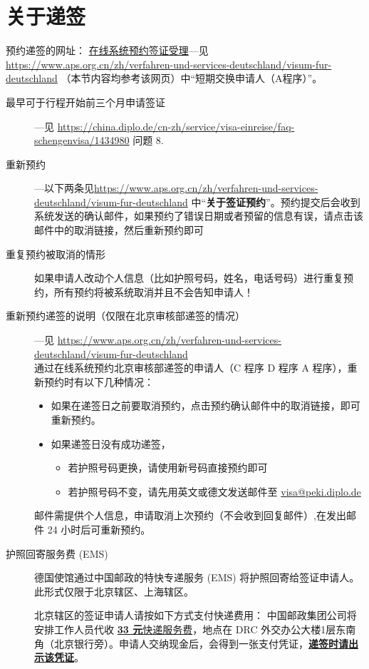 \documentclass[final]{book}
\begin{document}
\section{关于递签}\label{sec:visa}
\sloppy 预约递签的网址： \href{https://service2.diplo.de/rktermin/extern/choose_category.do?locationCode=peki&realmId=12&categoryId=156&request_locale=de}{在线系统预约签证受理}---见 \url{https://www.aps.org.cn/zh/verfahren-und-services-deutschland/visum-fur-deutschland} （本节内容均参考该网页）中“短期交换申请人（A程序）”。
\begin{description}
\item[最早可于行程开始前三个月申请签证] ---见 \url{https://china.diplo.de/cn-zh/service/visa-einreise/faq-schengenvisa/1434980} 问题 8.
\item[重新预约] ---以下两条见\sloppy \url{https://www.aps.org.cn/zh/verfahren-und-services-deutschland/visum-fur-deutschland} 中“\textbf{关于签证预约}”。预约提交后会收到系统发送的确认邮件，如果预约了错误日期或者预留的信息有误，请点击该邮件中的取消链接，然后重新预约即可
\item[重复预约被取消的情形] 如果申请人改动个人信息（比如护照号码，姓名，电话号码）进行重复预约，所有预约将被系统取消并且不会告知申请人！ 
\item[重新预约递签的说明（仅限在北京审核部递签的情况）] ---见 \url{https://www.aps.org.cn/zh/verfahren-und-services-deutschland/visum-fur-deutschland}\\
通过在线系统预约北京审核部递签的申请人（C 程序 D 程序 A 程序），重新预约时有以下几种情况：
\begin{itemize}
\item 如果在递签日之前要取消预约，点击预约确认邮件中的取消链接，即可重新预约。
\item 如果递签日没有成功递签，
\begin{itemize}
  \item 若护照号码更换，请使用新号码直接预约即可
  \item 若护照号码不变，请先用英文或德文发送邮件至 \href{mailto:visa@peki.diplo.de}{visa@peki.diplo.de}
\end{itemize}
\end{itemize}
邮件需提供个人信息，申请取消上次预约（不会收到回复邮件）,在发出邮件 24 小时后可重新预约。
\item[护照回寄服务费 (EMS)]

德国使馆通过中国邮政的特快专递服务 (EMS) 将护照回寄给签证申请人。此形式仅限于北京辖区、上海辖区。

北京辖区的签证申请人请按如下方式支付快递费用：
中国邮政集团公司将安排工作人员代收 \underline{\label{inline-money}\textbf{33 元}快递服务费}，地点在 DRC 外交办公大楼1层东南角（北京银行旁）。申请人交纳现金后，会得到一张支付凭证，\underline{\textbf{递签时请出示该凭证}}。


\end{description}
\end{document}
